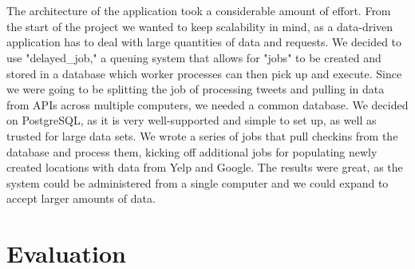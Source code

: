 \documentclass{article}
\begin{document}
\\ \\
The architecture of the application took a considerable amount of effort. From the start of the project we wanted to keep scalability in mind, as a data-driven application has to deal with large quantities of data and requests. We decided to use "delayed_job," a queuing system that allows for "jobs" to be created and stored in a database which worker processes can then pick up and execute. Since we were going to be splitting the job of processing tweets and pulling in data from APIs across multiple computers, we needed a common database. We decided on PostgreSQL, as it is very well-supported and simple to set up, as well as trusted for large data sets. We wrote a series of jobs that pull checkins from the database and process them, kicking off additional jobs for populating newly created locations with data from Yelp and Google. The results were great, as the system could be administered from a single computer and we could expand to accept larger amounts of data.

\section{Evaluation}

\end{document}
